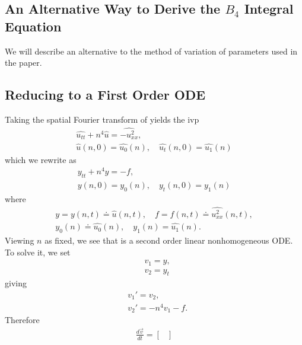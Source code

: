 \documentclass[12pt,reqno]{amsart}
\numberwithin{equation}{section}  %
\renewcommand{\cref}{\Cref}
\newcommand{\wh}{\widehat}
\begin{document}
\begin{appendices}
\section{An Alternative Way to Derive the $B_{4}$ Integral Equation}
\label{ssec:integral-form-deriv}
We will describe an alternative to the method of variation of parameters used in
the paper. 
%
%
\subsection{Reducing to a First Order ODE} 
\label{ssec:first-order-ode}
Taking the spatial Fourier transform of \cref{lin-mb} yields
the ivp
%
%
\begin{gather*}
  \wh{u_{tt}} + n^{4} \wh{u} = \wh{-u^{2}_{xx}},
  \\
  \wh{u}(n, 0) = \wh{u_{0}}(n), \quad \wh{u_{t}}(n, 0) = \wh{u_{1}}(n)
\end{gather*}
%
%
which we rewrite as 
%
%
\begin{gather}
  \label{eqn:lin-mb-ode}
  y_{tt} + n^{4}y = -f,
  \\
  y(n, 0) = y_{0}(n), \quad y_{t}(n, 0) = y_{1}(n)
\label{eqn:lin-mb-ode-init-data}
\end{gather}
%
%
where
%
%
\begin{gather*}
  \label{not-1}
  y = y(n, t) \doteq \wh{u}(n, t), \quad f = f(n, t) \doteq
  \wh{u^{2}_{xx}}(n,t),
  \\
  \label{not-2}
  y_{0}(n) \doteq \wh{u_{0}}(n), \quad y_{1}(n) = \wh{u_{1}}(n).
\end{gather*}
%
%
Viewing $n$ as fixed, we see that \cref{eqn:lin-mb-ode} is a second order
linear nonhomogeneous ODE\@. To solve it, we set 
%
%
\begin{equation*}
  \label{not-3}
\begin{split}
   & v_{1} = y, 
   \\
   & v_{2} = y_{t}
\end{split}
\end{equation*}
%
%
giving
%
%
\begin{equation*}
\begin{split}
  & v_{1}' = v_{2},
  \\
  & v_{2}' = -n^{4}v_{1} - f.
\end{split}
\end{equation*}
%
%
Therefore 
%
%
\begin{equation}
\begin{split}
\frac{d \vec v}{dt} = 
\begin{bmatrix}

\end{bmatrix}
\end{split}
\end{equation}
\end{appendices}
\end{document}
